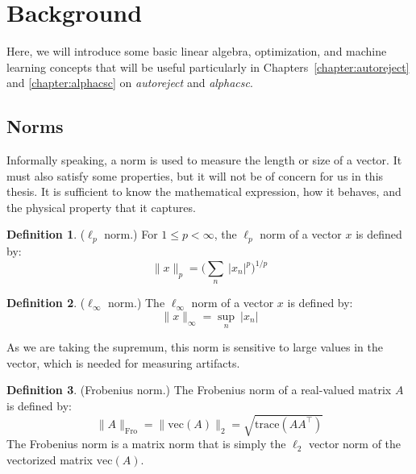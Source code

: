 
\section{Background}

Here, we will introduce some basic linear algebra, optimization, and machine learning concepts that will be useful particularly in Chapters~\ref{chapter:autoreject} and \ref{chapter:alphacsc} on \emph{autoreject} and \emph{alphacsc}.

\subsection{Norms}
Informally speaking, a norm is used to measure the length or size of a vector. It must also satisfy some properties, but it will not be of concern for us in this thesis. It is sufficient to know the mathematical expression, how it behaves, and the physical property that it captures.
\theoremstyle{definition}
\newtheorem{definition}{Definition}[chapter]
%
%
\vspace{\parskip}
\begin{definition}{($\ell_p$ norm.)}
For $1 \leq p < \infty$, the $\ell_p$ norm of a vector $x$ is defined by:
\begin{equation}
\|x\|_p = \Big(\sum_n \ \lvert x_n \rvert^p \Big)^{1/p}
\end{equation}
\end{definition}
%
%
\vspace{\parskip}
\begin{definition}{($\ell_\infty$ norm.)}
The $\ell_\infty$ norm of a vector $x$ is defined by:
\begin{equation}
\|x\|_{\infty} = \sup_n \ \lvert x_n \rvert
\end{equation}
\label{def:norm}
\end{definition}
As we are taking the supremum, this norm is sensitive to large values in the vector, which is needed for measuring artifacts.
%
%
\vspace{\parskip}
\begin{definition}{(Frobenius norm.)}
The Frobenius norm of a real-valued matrix $A$ is defined by:
\begin{equation}
\|A\|_{\mathrm{Fro}} = \| \mathrm{vec}(A) \|_2 = \sqrt{\mathrm{trace}(AA^\top)}
\end{equation}
%
The Frobenius norm is a matrix norm that is simply the $\ell_2$ vector norm of the vectorized matrix $\mathrm{vec}(A)$.

\end{definition}

